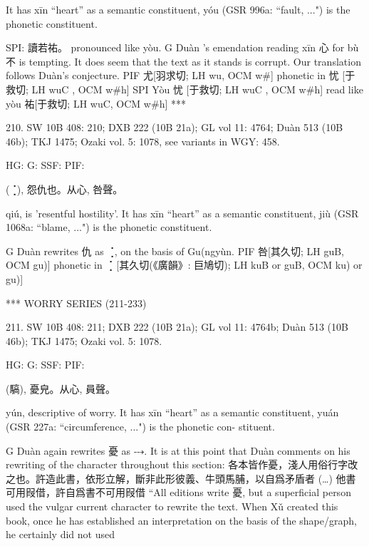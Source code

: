 {It has xīn ``heart'' as a semantic constituent,
yóu (GSR 996a: ``fault, ...") is the phonetic constituent.



SPI: 讀若祐。	pronounced like yòu.
G	Duàn 's emendation reading xīn 心 for bù 不 is tempting. It does seem that the text as it stands is corrupt. Our translation follows Duàn's conjecture.
PIF     尤[羽求切; LH wu, OCM w\#] phonetic in 忧 [于救切; LH wuC , OCM w\#h]
SPI     Yòu 忧 [于救切; LH wuC , OCM w\#h] read like yòu 祐[于救切; LH wuC, OCM w\#h]
***

210. SW 10B 408: 210; DXB 222 (10B 21a); GL vol 11: 4764; Duàn 513 (10B 46b); TKJ 1475; Ozaki vol. 5: 1078, see
variants in WGY: 458.


HG:
G: SSF: PIF:

(⢈),
怨仇也。从心,
咎聲。

qiú,
is 'resentful hostility'.
It has xīn ``heart'' as a semantic constituent,
jiù (GSR 1068a: ``blame, ...") is the phonetic constituent.

G	Duàn rewrites 仇 as ⢈, on the basis of Gu(ngyùn.
PIF     咎[其久切; LH guB, OCM gu)] phonetic in ⢈ [其久切(《廣韻》: 巨鳩切); LH kuB or guB, OCM ku) or gu)]


***
WORRY SERIES (211-233)

211. SW 10B 408: 211; DXB 222 (10B 21a); GL vol 11: 4764b; Duàn 513 (10B 46b); TKJ 1475; Ozaki vol. 5: 1078.



HG:
G: SSF: PIF:

(䮦),
憂皃。从心, 員聲。

yún,
descriptive of worry.
It has xīn ``heart'' as a semantic constituent,
yuán (GSR 227a: ``circumference, ...") is the phonetic con- stituent.

G    Duàn again rewrites 憂 as ⤏.
    It is at this point that Duàn comments on his rewriting of the character throughout this section: 各本皆作憂，淺人用俗行字改之也。許造此書，依形立解，斷非此形彼義、牛頭馬脯，以自爲矛盾者 (…) 他書可用叚借，許自爲書不可用叚借 ``All editions write 憂, but a superficial person used the vulgar current character to rewrite the text. When Xǔ created this book, once he has established an interpretation on the basis of the shape/graph, he certainly did not used




}
